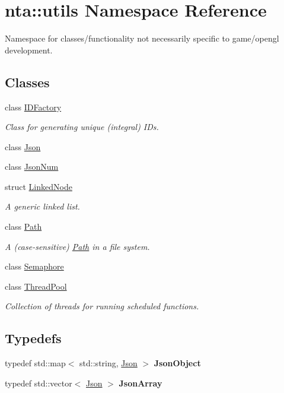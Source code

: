 \hypertarget{namespacenta_1_1utils}{}\section{nta\+:\+:utils Namespace Reference}
\label{namespacenta_1_1utils}


Namespace for classes/functionality not necessarily specific to game/opengl development.  


\subsection*{Classes}
\begin{DoxyCompactItemize}
\item 
class \hyperlink{classnta_1_1utils_1_1IDFactory}{I\+D\+Factory}
\begin{DoxyCompactList}\small\item\em Class for generating unique (integral) I\+Ds. \end{DoxyCompactList}\item 
class \hyperlink{classnta_1_1utils_1_1Json}{Json}
\item 
class \hyperlink{classnta_1_1utils_1_1JsonNum}{Json\+Num}
\item 
struct \hyperlink{structnta_1_1utils_1_1LinkedNode}{Linked\+Node}
\begin{DoxyCompactList}\small\item\em A generic linked list. \end{DoxyCompactList}\item 
class \hyperlink{classnta_1_1utils_1_1Path}{Path}
\begin{DoxyCompactList}\small\item\em A (case-\/sensitive) \hyperlink{classnta_1_1utils_1_1Path}{Path} in a file system. \end{DoxyCompactList}\item 
class \hyperlink{classnta_1_1utils_1_1Semaphore}{Semaphore}
\item 
class \hyperlink{classnta_1_1utils_1_1ThreadPool}{Thread\+Pool}
\begin{DoxyCompactList}\small\item\em Collection of threads for running scheduled functions. \end{DoxyCompactList}\end{DoxyCompactItemize}
\subsection*{Typedefs}
\begin{DoxyCompactItemize}
\item 
\mbox{\label{namespacenta_1_1utils_aacec41f909698427351bd2d4e6bfb0ff}} 
typedef std\+::map$<$ std\+::string, \hyperlink{classnta_1_1utils_1_1Json}{Json} $>$ {\bfseries Json\+Object}
\item 
\mbox{\label{namespacenta_1_1utils_a016ff68f749b52514dae354976f110ea}} 
typedef std\+::vector$<$ \hyperlink{classnta_1_1utils_1_1Json}{Json} $>$ {\bfseries Json\+Array}
\end{DoxyCompactItemize}

